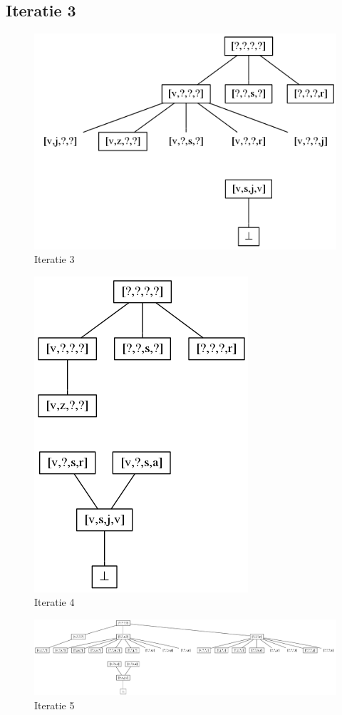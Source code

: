 \documentclass[alternative-exam.tex]{subfiles}
\begin{document}
\subsection{Iteratie 3}
\begin{figure}
[H]
\centering
\caption{Iteratie 3}
\label{iter_3}
\includegraphics[scale=0.5]{resources/graphs/iteration_3.png}
\end{figure}
\begin{figure}
[H]
\centering
\caption{Iteratie 4}
\label{iter_4}
\includegraphics[scale=0.5]{resources/graphs/iteration_4.png}
\end{figure}
\begin{figure}
\centering
\caption{Iteratie 5}
\label{iter_5}
\includegraphics[scale=0.35]{resources/graphs/iteration_5.png}
\end{figure}
\end{document}
